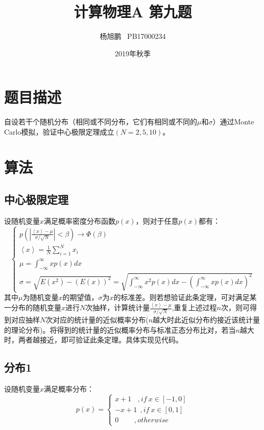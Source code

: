 \documentclass[a4paper,11pt]{article}
\author{ 杨旭鹏  \  PB17000234}
\date{2019年秋季}
\title{计算物理A 第九题}
\begin{document}
\maketitle

\section{题目描述}
自设若干个随机分布（相同或不同分布，它们有相同或不同的$\mu$和$\sigma$）通过Monte Carlo模拟，验证中心极限定理成立$(N =2,5,10)$。


\section{算法}
\subsection{中心极限定理}
设随机变量$x$满足概率密度分布函数$p(x)$，则对于任意$p(x)$都有：
\begin{equation}
\left\{
\begin{array}{l}
	p\left( \left |\frac{\left<x \right>-\mu}{\sigma/\sqrt{N}} \right| < \beta \right) \rightarrow \Phi(\beta) \\
	\left<x \right>  = \frac{1}{N}\sum_{i=1}^{N}x_{i} \\
	\mu = \int_{-\infty}^{\infty} xp(x)dx \\
	\sigma = \sqrt{E(x^{2})-(E(x))^{2}} = \sqrt{\int_{-\infty}^{\infty} x^{2}p(x)dx - \left( \int_{-\infty}^{\infty} xp(x)dx \right)^{2} }
\end{array}
\right.
\end{equation}
其中$\mu$为随机变量$x$的期望值，$\sigma$为$x$的标准差。则若想验证此条定理，可对满足某一分布的随机变量$x$进行$N$次抽样，计算统计量$\frac{\left<x \right>-\mu}{\sigma/\sqrt{N}} $,重复上述过程$n$次，则可得到对应抽样$N$次对应的统计量的近似概率分布($n$越大时此近似分布约接近该统计量的理论分布)。将得到的统计量的近似概率分布与标准正态分布比对，若当$n$越大时，两者越接近，即可验证此条定理。具体实现见代码。

\subsection{分布1}
设随机变量$x$满足概率分布：
\begin{equation}
p(x) = 
\left\{
\begin{array}{l}
x+1~~~~,if~x\in [-1,0]  \\
-x+1~~,if~x\in[0,1]  \\
0~~~~~~~~~~,otherwise	
\end{array}
\right.
\end{equation}
\end{document}
